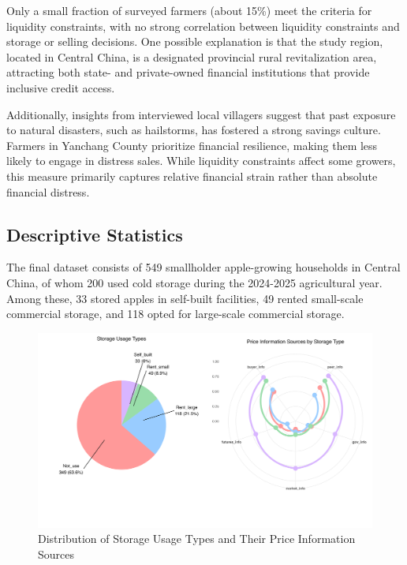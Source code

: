 Only a small fraction of surveyed farmers (about 15\%) meet the criteria for liquidity constraints, with no strong correlation between liquidity constraints and storage or selling decisions. One possible explanation is that the study region, located in Central China, is a designated provincial rural revitalization area, attracting both state- and private-owned financial institutions that provide inclusive credit access.  

Additionally, insights from interviewed local villagers suggest that past exposure to natural disasters, such as hailstorms, has fostered a strong savings culture. Farmers in Yanchang County prioritize financial resilience, making them less likely to engage in distress sales. While liquidity constraints affect some growers, this measure primarily captures relative financial strain rather than absolute financial distress.  




\subsection{Descriptive Statistics}  
\noindent The final dataset consists of 549 smallholder apple-growing households in Central China, of whom 200 used cold storage during the 2024-2025 agricultural year. Among these, 33 stored apples in self-built facilities, 49 rented small-scale commercial storage, and 118 opted for large-scale commercial storage.  

\begin{figure}[htp]
\centering
\includegraphics[width=1\textwidth]{figures/storage_usage_analysis_soft_colors.png}
\caption{Distribution of Storage Usage Types and Their Price Information Sources}
\label{Figure: pie and radar chart}
\end{figure}

